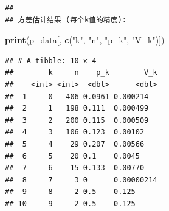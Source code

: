 \documentclass[
]{article}
\newenvironment{Shaded}{\begin{snugshade}}{\end{snugshade}}
\newcommand{\FunctionTok}[1]{\textcolor[rgb]{0.13,0.29,0.53}{\textbf{#1}}}
\newcommand{\NormalTok}[1]{#1}
\newcommand{\StringTok}[1]{\textcolor[rgb]{0.31,0.60,0.02}{#1}}
\begin{document}
\begin{verbatim}
## 
## 方差估计结果 (每个k值的精度):
\end{verbatim}

\begin{Shaded}
\begin{Highlighting}[]
\FunctionTok{print}\NormalTok{(p\_data[, }\FunctionTok{c}\NormalTok{(}\StringTok{"k"}\NormalTok{, }\StringTok{"n"}\NormalTok{, }\StringTok{"p\_k"}\NormalTok{, }\StringTok{"V\_k"}\NormalTok{)])}
\end{Highlighting}
\end{Shaded}

\begin{verbatim}
## # A tibble: 10 x 4
##        k     n    p_k        V_k
##    <int> <int>  <dbl>      <dbl>
##  1     0   406 0.0961 0.000214  
##  2     1   198 0.111  0.000499  
##  3     2   200 0.115  0.000509  
##  4     3   106 0.123  0.00102   
##  5     4    29 0.207  0.00566   
##  6     5    20 0.1    0.0045    
##  7     6    15 0.133  0.00770   
##  8     7     3 0      0.00000214
##  9     8     2 0.5    0.125     
## 10     9     2 0.5    0.125
\end{verbatim}
\end{document}
